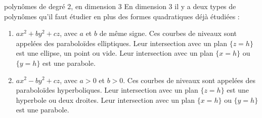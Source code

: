 \documentclass[11pt]{m53beamer}
\begin{document}
\begin{frame}{polynômes de degré 2, en dimension 3}
  En dimension $3$ il y a deux types de polynômes qu'il faut étudier en plus des formes quadratiques déjà étudiées :
  \begin{enumerate}[<+(1)->]
    \item $ax^{2}+by^{2}+cz$, avec $a$ et $b$ de même signe.\pause{} Ces courbes de niveaux sont appelées des \alert{paraboloïdes elliptiques}.\pause\newline
    Leur intersection avec un plan $\{z=h\}$ est une ellipse\pause, un point ou vide.\pause\newline
    Leur intersection avec un plan $\{x=h\}$ ou $\{y=h\}$ est une parabole.
    \item $ax^{2}-by^{2}+cz$, avec $a>0$ et $b>0$. \pause{} Ces courbes de niveaux sont appelées des \alert{paraboloïdes hyperboliques}.\pause\newline
    Leur intersection avec un plan $\{z=h\}$ est une hyperbole\pause{} ou deux droites.\pause\newline
    Leur intersection avec un plan $\{x=h\}$ ou $\{y=h\}$ est une parabole.
  \end{enumerate}
\end{frame}
\end{document}
